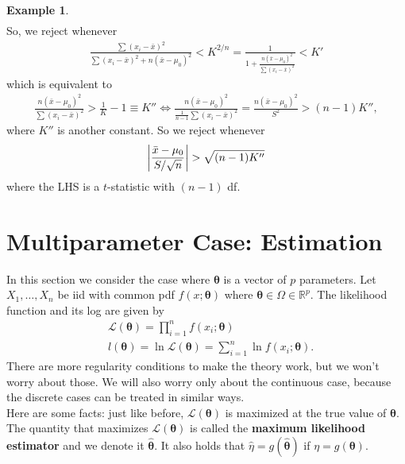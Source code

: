 \documentclass{book}
\theoremstyle{definition}
\newtheorem{exmp}{Example}[section]
\newcommand{\lag}{\mathcal{L}}
\newcommand{\f}[2]{\frac{#1}{#2}}
\begin{document}
\begin{exmp}
\begin{align}
	\end{align}
	So, we reject whenever
	\begin{align}
	\f{\sum(x_i - \bar{x})^2}{\sum (x_i - \bar{x})^2 + n(\bar{x} - \mu_0)^2} < K^{2/n} = \f{1}{1 + \f{n(\bar{x} - \mu_0)^2}{\sum (x_i - \bar{x})^2}} <  K'
	\end{align}
	which is equivalent to 
	\begin{align}
	\f{n (\bar{x}- \mu_0)^2}{\sum (x_i - \bar{x})^2} > \f{1}{K} - 1 \equiv K'' \iff \f{n (\bar{x}- \mu_0)^2}{\f{1}{n-1}\sum (x_i - \bar{x})^2} =  \f{n (\bar{x}- \mu_0)^2}{S^2}> (n-1)K'',
	\end{align}
	where $K''$ is another constant. So we reject whenever
	\begin{align}
	\abs{\f{\bar{x} - \mu_0}{S/\sqrt{n}}} > \sqrt{(n-1)K''}
	\end{align}
	where the LHS is a $t$-statistic with $(n-1)$ df.
	
\end{exmp}


















\section{Multiparameter Case: Estimation}


In this section we consider the case where $\bm{\theta}$ is a vector of $p$ parameters. Let $X_1,\dots, X_n$ be iid with common pdf $f(x;\bm\theta)$ where $\bm\theta \in \Omega \in \mathbb{R}^p$. The likelihood function and its log are given by
\begin{align}
&\lag(\bm\theta) = \prod^n_{i=1} f(x_i ;\bm\theta)\\
&l(\bm\theta) = \ln \lag(\bm\theta) = \sum^n_{i=1} \ln f(x_i ;\bm\theta).
\end{align}
There are more regularity conditions to make the theory work, but we won't worry about those. We will also worry only about the continuous case, because the discrete cases can be treated in similar ways. \\

Here are some facts: just like before, $\lag(\bm\theta)$ is maximized at the true value of $\bm\theta$. The quantity that maximizes $\lag(\bm\theta)$ is called the \textbf{maximum likelihood estimator} and we denote it $\hat{\bm\theta}$. It also holds that $\hat\eta = g(\hat{\bm\theta})$ if $\eta = g(\bm\theta)$. \\
\end{document}
